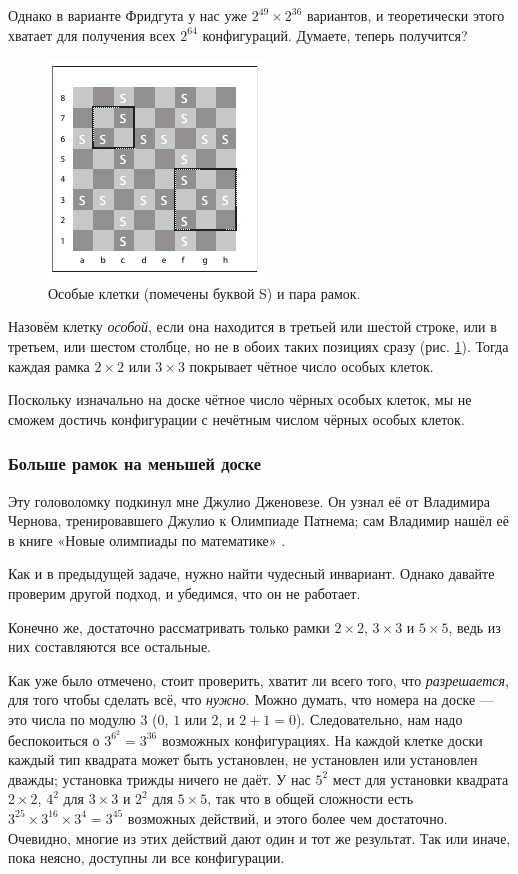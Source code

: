 Однако в варианте Фридгута у нас уже $2^{49} \times 2^{36}$ вариантов, и теоретически этого хватает для получения всех $2^{64}$ конфигураций.
Думаете, теперь получится?

\begin{figure}[ht!]
\centering
\includegraphics[scale=1]{pics/chess}
\caption{Особые клетки (помечены буквой S) и пара рамок.}
\label{pic:chess1}
\end{figure}

Назовём клетку \emph{особой}, если она находится в третьей или шестой строке, или в третьем, или шестом столбце, но не в обоих таких позициях сразу (рис. \ref{pic:chess1}).
Тогда каждая рамка $2 \times 2$ или $3 \times 3$ покрывает чётное число особых клеток.

Поскольку изначально на доске чётное число чёрных особых клеток, мы не сможем достичь конфигурации с нечётным  числом чёрных особых клеток.

\subsubsection*{Больше рамок на меньшей доске}

Эту головоломку подкинул мне Джулио Дженовезе.
Он узнал её от Владимира Чернова, тренировавшего Джулио к Олимпиаде Патнема; сам Владимир нашёл её в книге «Новые олимпиады по математике» \cite{markova}.

Как и в предыдущей задаче, нужно найти чудесный инвариант.
Однако давайте проверим другой подход, и убедимся, что он не работает.

Конечно же, достаточно рассматривать только рамки $2 \times 2$, $3 \times 3$ и $5 \times 5$, ведь из них составляются все остальные.

Как уже было отмечено, стоит проверить, хватит ли всего того, что \emph{разрешается}, для того чтобы сделать всё, что \emph{нужно}.
Можно думать, что номера на доске --- это числа по модулю $3$ ($0$, $1$ или $2$, и $2 + 1 = 0$).
Следовательно, нам надо беспокоиться о $3^{6^2} = 3^{36}$ возможных конфигурациях.
На каждой клетке доски каждый тип квадрата может быть установлен, не установлен или установлен дважды; установка трижды ничего не даёт.
У нас $5^2$ мест для установки квадрата $2 \times 2$,
$4^2$ для $3 \times 3$
и $2^2$ для $5 \times 5$, так что в общей сложности есть $3^{25} \times 3^{16} \times 3^4 = 3^{45}$ возможных действий, и этого более чем достаточно.
Очевидно, многие из этих действий дают один и тот же результат.
Так или иначе, пока неясно, доступны ли все конфигурации.

